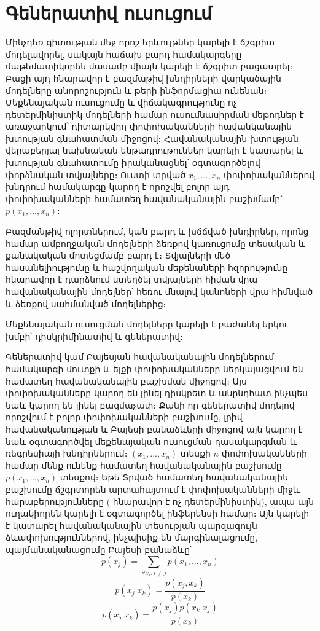 \documentclass[11pt]{article}
\begin{document}
\section*{\hfill Գեներատիվ ուսուցում \hfill} \noindent

{}


\par Մինչդեռ գիտության մեջ որոշ երևույթներ կարելի է ճշգրիտ մոդելավորել, սակայն հաճախ բարդ համակարգերը մաթեմատիկորեն մասամբ միայն կարելի է ճշգրիտ բացատրել։ Բացի այդ հնարավոր է բազմաթիվ խնդիրների վարկածային մոդելները անորոշություն և թերի ինֆորմացիա ունենան։ Մեքենայական ուսուցումը և վիճակագրությունը ոչ դետերմինիստիկ մոդելների համար ուսումնասիրման մեթոդներ է առաջարկում՝  դիտարկվող փոփոխականների հավանկանային խտության գնահատման միջոցով։ Հավանականային խտության վերաբերյալ նախնական ենթադրութուններ կարելի է կատարել և խտության գնահատումը իրականացնել՝ օգտագործելով փորձնական տվյալները։ Ուստի տրված $x_1, ..., x_n$ փոփոխականներով խնդրում համակարգը կարող է որոշվել բոլոր այդ փոփոխականների համատեղ հավանականային բաշխմամբ՝ $p  \left ( x_1, ..., x_n \right )$։
\par Բազմանթիվ ոլորտներում, կան բարդ և խճճված խնդիրներ, որոնց համար ամբողջական մոդելների ձեռքով կառուցումը  տեսական և քանակական մոտեցմամբ  բարդ է։ Տվյալների մեծ հասանելիությունը և հաշվողական մեքենաների հզորությունը հնարավոր է դարձնում ստեղծել տվյալների հիման վրա հավանականային մոդելներ՝ հեռու մնալով կանոների վրա հիմնված և ձեռքով սահմանված մոդելներից։ 

\par
Մեքենայական ուսուցման մոդելները կարելի է բաժանել երկու խմբի՝ դիսկրիմինատիվ և գեներատիվ։


Գեներատիվ կամ Բայեսյան հավանականային մոդելներում համակարգի մուտքի և ելքի փոփոխականները ներկայացվում են համատեղ հավանականային բաշխման միջոցով։ Այս փոփոխականները կարող են լինել դիսկրետ և անընդհատ ինչպես նաև կարող են լինել բազմաչափ։ Քանի որ գեներատիվ մոդելով որոշվում է բոլոր փոփոխականների բաշխումը, լրիվ  հավանականության և Բայեսի բանաձևերի միջոցով   այն կարող է նաև օգտագործվել մեքենայական ուսուցման դասակարգման և ռեգրեսիայի խնդիրներում։ $(x_1, ..., x_n)$ տեսքի $n$ փոփոխականների համար մենք ունենք համատեղ հավանականային բաշխումը $p(x_1, ..., x_n)$ տեսքով։ Եթե Տրված համատեղ հավանականային բաշխումը ճշգրտորեն արտահայտում է փոփոխականների միջև հարաբերությունները ( հնարավոր է ոչ դետերմինիստիկ), ապա այն ուղակիորեն կարելի է օգտագործել ինֆերենսի համար։  Այն կարելի է կատարել հավանականային տեսության պարզագույն ձևափոխություններով, ինչպիսիք են մարգինալացումը, պայմանականացումը Բայեսի բանաձևը՝
$$p(x_j) = \sum_{\forall x_i, i \neq j}{p(x_1, ..., x_n)}$$
$$p(x_j | x_k) = \frac {p(x_j, x_k)} {p(x_k)}$$
$$p(x_j | x_k) = \frac {p(x_j)p(x_k |x_j)} {p(x_k)}$$
\end{document}
